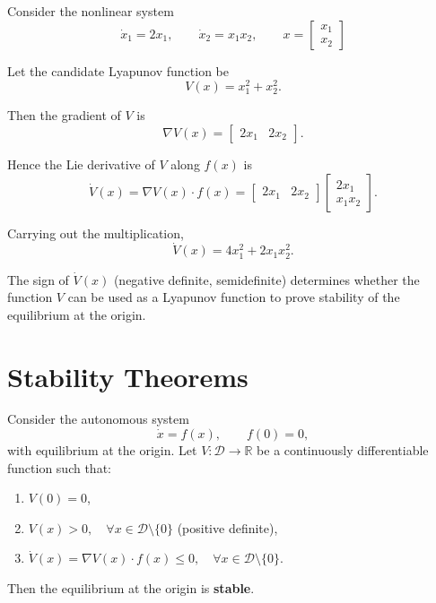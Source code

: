 \begin{example}
Consider the nonlinear system
\[
    \dot{x}_1 = 2x_1, 
    \qquad 
    \dot{x}_2 = x_1x_2,
    \qquad
    x = \begin{bmatrix}x_1 \\ x_2\end{bmatrix}
\]

Let the candidate Lyapunov function be
\[
    V(x) = x_1^2 + x_2^2.
\]

Then the gradient of $V$ is
\[
    \nabla V(x) = \begin{bmatrix} 2x_1 & 2x_2 \end{bmatrix}.
\]

Hence the Lie derivative of $V$ along $f(x)$ is
\[
    \dot{V}(x) = \nabla V(x)\cdot f(x) 
    = \begin{bmatrix} 2x_1 & 2x_2 \end{bmatrix}
      \begin{bmatrix} 2x_1 \\ x_1x_2 \end{bmatrix}.
\]

Carrying out the multiplication,
\[
    \dot{V}(x) = 4x_1^2 + 2x_1x_2^2.
\]

\end{example}

\begin{remark}
The sign of $\dot{V}(x)$ (negative definite, semidefinite) determines whether the function $V$ can be used as a Lyapunov function to prove stability of the equilibrium at the origin.
\end{remark}

\section{Stability Theorems}

\begin{theorem}
Consider the autonomous system
\[
    \dot{x} = f(x), \qquad f(0)=0,
\]
with equilibrium at the origin.  
Let $V:\mathcal{D}\to \mathbb{R}$ be a continuously differentiable function such that:
\begin{enumerate}
    \item $V(0) = 0$,
    \item $V(x) > 0, \quad \forall x \in \mathcal{D}\setminus\{0\}$ (positive definite),
    \item $\dot V(x) = \nabla V(x)\cdot f(x) \leq 0, \quad \forall x \in \mathcal{D}\setminus\{0\}$.
\end{enumerate}
Then the equilibrium at the origin is \textbf{stable}.
\end{theorem}

